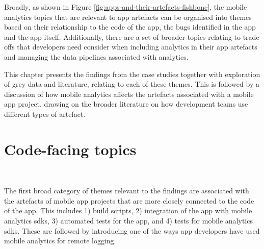 Broadly, as shown in Figure \ref{fig:apps-and-their-artefacts-fishbone}, the mobile analytics topics that are relevant to app artefacts can be organised into themes based on their relationship to the code of the app, the bugs identified in the app and the app itself. Additionally, there are a set of broader topics relating to trade offs that developers need consider when including analytics in their app artefacts and managing the data pipelines associated with analytics.

This chapter presents the findings from the case studies together with exploration of grey data and literature, relating to each of these themes. This is followed by a discussion of how mobile analytics affects the artefacts associated with a mobile app project, drawing on the broader literature on how development teams use different types of artefact.



\section{Code-facing topics}~\label{aata-code-facing-topics}

The first broad category of themes relevant to the findings are associated with the artefacts of mobile app projects that are more closely connected to the code of the app. This includes 1) build scripts, 2) integration of the app with mobile analytics \Gls{sdk}s, 3) automated tests for the app, and 4) tests for mobile analytics \Gls{sdk}s. These are followed by introducing one of the ways app developers have used mobile analytics for remote logging.

